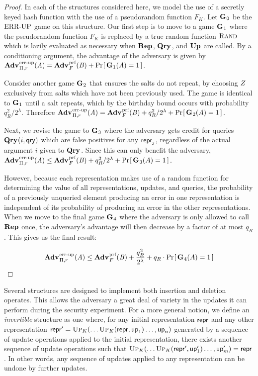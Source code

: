 \begin{proof}
In each of the structures considered here, we model the use of a secretly keyed hash function with the use of a pseudorandom function $F_K$. Let $\mathbf{G}\hspace{0.5pt}_0$ be the $\textnormal{ERR\mbox{-}UP}$ game on this structure. Our first step is to move to a game $\mathbf{G}\hspace{0.5pt}_1$ where the pseudorandom function $F_K$ is replaced by a true random function $\textsc{Rand}$ which is lazily evaluated as necessary when $\mathbf{Rep}\hspace{0.5pt}$, $\mathbf{Qry}\hspace{0.5pt}$, and $\mathbf{Up}\hspace{0.5pt}$ are called. By a conditioning argument, the advantage of the adversary is given by $\Adv{\errep}_{\struct,r}(\advA) = \Adv{\prf}_F(\advB) + \Prob{\game_1(\advA)=1}$.

Consider another game $\mathbf{G}\hspace{0.5pt}_2$ that ensures the salts do not repeat, by choosing $Z$ exclusively from salts which have not been previously used. The game is identical to $\mathbf{G}\hspace{0.5pt}_1$ until a salt repeats, which by the birthday bound occurs with probability $q_R^2/2^\lambda$. Therefore $\Adv{\errep}_{\struct,r}(\advA) = \Adv{\prf}_F(\advB) + q_R^2/2^\lambda + \Prob{\game_2(A) = 1}$.

Next, we revise the game to $\mathbf{G}\hspace{0.5pt}_3$ where the adversary gets credit for queries $\mathbf{Qry}\hspace{0.5pt}(i,\mathsf{qry})$ which are false positives for any $\mathsf{repr}_j$, regardless of the actual argument $i$ given to $\mathbf{Qry}\hspace{0.5pt}$. Since this can only benefit the adversary, $\Adv{\errep}_{\struct,r}(\advA) \le \Adv{\prf}_F(\advB) + q_R^2/2^\lambda + \Prob{\game_3(A) = 1}$.

However, because each representation makes use of a random function for determining the value of all representations, updates, and queries, the probability of a previously unqueried element producing an error in one representation is independent of its probability of producing an error in the other representations. When we move to the final game $\mathbf{G}\hspace{0.5pt}_4$ where the adversary is only allowed to call $\mathbf{Rep}\hspace{0.5pt}$ once, the adversary's advantage will then decrease by a factor of at most $q_R$. This gives us the final result:

$$\Adv{\errep}_{\struct,r}(\advA) \le \Adv{\prf}_F(\advB) + \frac{q_R^2}{2^\lambda} + q_R \cdot \Prob{\game_4(A) = 1}$$\missingqed
\end{proof}


Several structures are designed to implement both insertion and deletion operates. This allows the adversary a great deal of variety in the updates it can perform during the security experiment. For a more general notion, we define an \textit{invertible} structure as one where, for any initial representation $\mathsf{repr}$ and any other representation $\mathsf{repr}' = \textsc{Up}_K(\ldots\textsc{Up}_K(\mathsf{repr},\mathsf{up}_1)\ldots,\mathsf{up}_n)$ generated by a sequence of update operations applied to the initial representation, there exists another sequence of update operations such that $\textsc{Up}_K(\ldots\textsc{Up}_K(\mathsf{repr}',\mathsf{up}'_1)\ldots,\mathsf{up}'_m) = \mathsf{repr}$. In other words, any sequence of updates applied to any representation can be undone by further updates.

